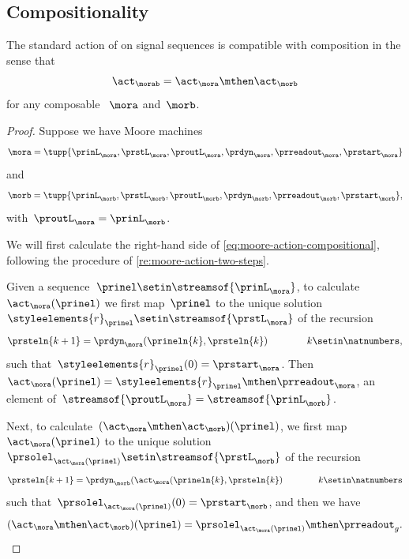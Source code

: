 {

\subsection{Compositionality}

\begin{proposition}
    \label{prop:moore-action-is-a-morphism}
    The standard action of  on signal sequences is compatible with  composition in the sense that
    \begin{equation}
        \label{eq:moore-action-compositional}
        \act_{\morab} = \act_\mora \mthen \act_\morb
    \end{equation}
    for any composable ~$\mora$ and~$\morb$.
\end{proposition}

\begin{proof}
    Suppose we have Moore machines
    \begin{equation}
        \mora = \tupp{\prinL_{\mora},\prstL_{\mora},\proutL_{\mora},\prdyn_{\mora},\prreadout_{\mora},\prstart_{\mora}}
    \end{equation}
    and
    \begin{equation}
        \morb = \tupp{\prinL_{\morb},\prstL_{\morb},\proutL_{\morb},\prdyn_{\morb},\prreadout_{\morb},\prstart_{\morb}},
    \end{equation}
    with~$\proutL_\mora = \prinL_\morb$.

    We will first calculate the right-hand side of \cref{eq:moore-action-compositional}, following the procedure of \cref{re:moore-action-two-steps}.

    Given a sequence~$\prinel \setin \streamsof{\prinL_{\mora}}$, to calculate~$\act_\mora(\prinel)$ we first map~$\prinel$ to the unique solution~$\styleelements{r}_\prinel \setin \streamsof{\prstL_{\mora}}$ of the recursion
    \begin{equation}
        \prsteln{k+1} = \prdyn_\mora(\prineln{k}, \prsteln{k}) \qquad \qquad k \setin \natnumbers,
    \end{equation}
    such that~$\styleelements{r}_\prinel(0) = \prstart_{\mora}$.
    Then~$\act_\mora(\prinel) = \styleelements{r}_\prinel \mthen \prreadout_\mora$, an element of~$\streamsof{\proutL_{\mora}} = \streamsof{\prinL_{\morb}}$.

    Next, to calculate~$(\act_\mora \mthen \act_\morb)(\prinel)$, we first map~$\act_\mora(\prinel)$ to the unique solution~$\prsolel_{\act_\mora(\prinel)} \setin \streamsof{\prstL_{\morb}}$ of the recursion
        \begin{equation}
            \prsteln{k+1} = \prdyn_\morb(\act_\mora(\prineln{k}, \prsteln{k}) \qquad \qquad k \setin \natnumbers
        \end{equation}
        such that~$\prsolel_{\act_\mora(\prinel)}(0) = \prstart_{\morb}$, and then we have
        \begin{equation}
            \label{eq:Moore-act-composition-1}
            (\act_\mora \mthen \act_\morb)(\prinel) = \prsolel_{\act_\mora(\prinel)} \mthen \prreadout_g.
        \end{equation}


\end{proof}}
